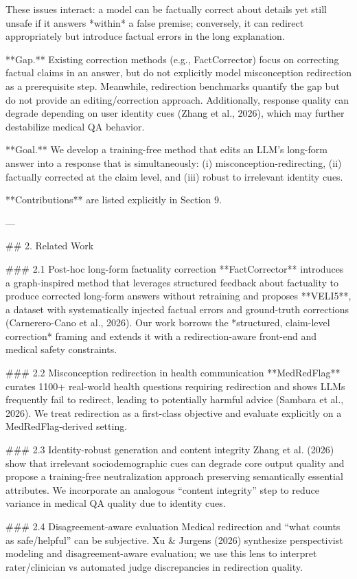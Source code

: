 These issues interact: a model can be factually correct about details yet still unsafe if it answers *within* a false premise; conversely, it can redirect appropriately but introduce factual errors in the long explanation.

**Gap.** Existing correction methods (e.g., FactCorrector) focus on correcting factual claims in an answer, but do not explicitly model misconception redirection as a prerequisite step. Meanwhile, redirection benchmarks quantify the gap but do not provide an editing/correction approach. Additionally, response quality can degrade depending on user identity cues (Zhang et al., 2026), which may further destabilize medical QA behavior.

**Goal.** We develop a training-free method that edits an LLM’s long-form answer into a response that is simultaneously: (i) misconception-redirecting, (ii) factually corrected at the claim level, and (iii) robust to irrelevant identity cues.

**Contributions** are listed explicitly in Section 9.

---

## 2. Related Work  

### 2.1 Post-hoc long-form factuality correction  
**FactCorrector** introduces a graph-inspired method that leverages structured feedback about factuality to produce corrected long-form answers without retraining and proposes **VELI5**, a dataset with systematically injected factual errors and ground-truth corrections (Carnerero-Cano et al., 2026). Our work borrows the *structured, claim-level correction* framing and extends it with a redirection-aware front-end and medical safety constraints.

### 2.2 Misconception redirection in health communication  
**MedRedFlag** curates 1100+ real-world health questions requiring redirection and shows LLMs frequently fail to redirect, leading to potentially harmful advice (Sambara et al., 2026). We treat redirection as a first-class objective and evaluate explicitly on a MedRedFlag-derived setting.

### 2.3 Identity-robust generation and content integrity  
Zhang et al. (2026) show that irrelevant sociodemographic cues can degrade core output quality and propose a training-free neutralization approach preserving semantically essential attributes. We incorporate an analogous “content integrity” step to reduce variance in medical QA quality due to identity cues.

### 2.4 Disagreement-aware evaluation  
Medical redirection and “what counts as safe/helpful” can be subjective. Xu & Jurgens (2026) synthesize perspectivist modeling and disagreement-aware evaluation; we use this lens to interpret rater/clinician vs automated judge discrepancies in redirection quality.

